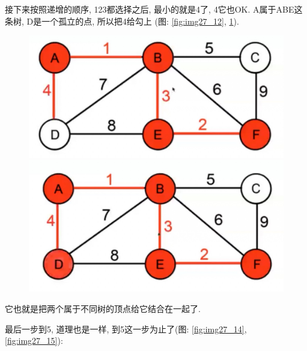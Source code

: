 接下来按照递增的顺序, 123都选择之后, 最小的就是4了, 4它也OK. A属于ABE这条树, D是一个孤立的点, 所以把4给勾上 (图: \ref{fig:img27_12}, \ref{fig:img27_13}). 

\begin{figure}[ht]
  \centering
  \begin{minipage}[t]{0.4\textwidth}
    \centering
    \caption{}
    \label{fig:img27_12}
    \includegraphics[width=\textwidth]{asset/90cfb2e1-d182-4637-a969-08136f9db0f3.jpg}
  \end{minipage}%
  \hspace{1em}
  \begin{minipage}[t]{0.4\textwidth}
    \centering
    \caption{}
    \label{fig:img27_13}
    \includegraphics[width=\textwidth]{asset/0d6a03e3-624d-4dfc-a8b8-ee7bc651cf5a.jpg}
  \end{minipage}
\end{figure}

它也就是把两个属于不同树的顶点给它结合在一起了. 

最后一步到5, 道理也是一样, 到5这一步为止了(图: \ref{fig:img27_14}, \ref{fig:img27_15}): 

